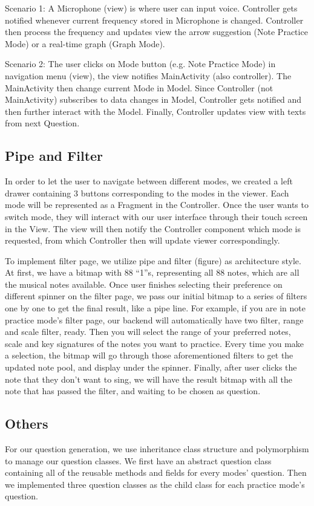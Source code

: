 \documentclass{article}
\begin{document}
Scenario 1:
A Microphone (view) is where user can input voice. Controller gets notified whenever current frequency stored in Microphone is changed. Controller then process the frequency and updates view the arrow suggestion (Note Practice Mode) or a real-time graph (Graph Mode). 


Scenario 2:
The user clicks on Mode button (e.g. Note Practice Mode) in navigation menu (view), the view notifies MainActivity (also controller). The MainActivity then change current Mode in Model. Since Controller (not MainActivity) subscribes to data changes in Model, Controller gets notified and then further interact with the Model. Finally, Controller updates view with texts from next Question.

\subsection{Pipe and Filter}
In order to let the user to navigate between different modes, we created a left drawer containing 3 buttons corresponding to the modes in the viewer. Each mode will be represented as a Fragment in the Controller. Once the user wants to switch mode, they will interact with our user interface through their touch screen in the View. The view will then notify the Controller component which mode is requested, from which Controller then will update viewer correspondingly.


To implement filter page, we utilize pipe and filter (figure) as architecture style. At first, we have a bitmap with 88 “1”s, representing all 88 notes, which are all the musical notes available. Once user finishes selecting their preference on different spinner on the filter page, we pass our initial bitmap to a series of filters one by one to get the final result, like a pipe line. For example, if you are in note practice mode’s filter page, our backend will automatically have two filter, range and scale filter, ready. Then you will select the range of your preferred notes, scale and key signatures of the notes you want to practice. Every time you make a selection, the bitmap will go through those aforementioned filters to get the updated note pool, and display under the spinner. Finally, after user clicks the note that they don’t want to sing, we will have the result bitmap with all the note that has passed the filter, and waiting to be chosen as question.

\subsection{Others}
For our question generation, we use inheritance class structure and polymorphism to manage our question classes. We first have an abstract question class containing all of the reusable methods and fields for every modes’ question. Then we implemented three question classes as the child class for each practice mode’s question. 
 
\end{document}
